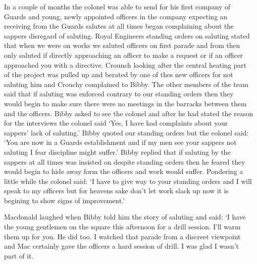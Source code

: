In a couple of months the colonel was able to send for his first
company of Guards and young, newly appointed officers in the company
expecting an receiving from the Guards salutes at all times began
complaining about the sappers disregard of saluting. Royal Engineers
standing orders on saluting stated that when we were on works we
saluted officers on first parade and from then only saluted if
directly approaching an officer to make a request or if an officer
approached you with a directive. \Sapper Crounch looking after the
central heating part of the project was pulled up and berated by one
of thes new officers for not saluting him and Crouchy complained to
\sergeant Bibby. The other members of the team said that if saluting
was enforced contrary to our standing orders then they would begin to
make sure there were no meetings in the barracks between them and the
officers. Bibby asked to see the colonel and after he had stated the
reason for the interviews the colonel said `Yes, I have had complaints
about your sappers' lack of saluting.' Bibby quoted our standing orders
but the colonel said: `You are now in a Guards establishment and if
my men see your sappers not saluting I fear discipline might suffer.'
Bibby replied that if saluting by the sappers at all times was
insisted on despite standing orders then he feared they would begin to
hide away form the officers and work would suffer. Pondering a little
while the colonel said: `I have to give way to your standing orders
and I will speak to my officers but for heavens sake don't let work
slack up now it is begining to show signs of improvement.'

\SergeantM Macdonald laughed when Bibby told him the story of
saluting and said: `I have the young gentlemen on the square this
afternoon for a drill session. I'll warm them up for you. He did
too. I watched that parade from a discreet viewpoint and Mac certainly
gave the officers a hard session of drill. I was glad I wasn't part of
it.

